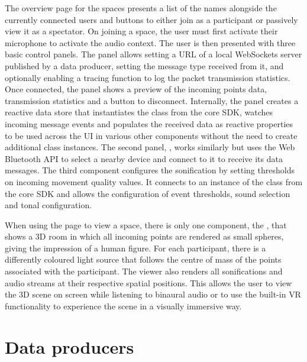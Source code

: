 The overview page for the spaces presents a list of the names alongside the currently connected users and buttons to either join as a participant or passively view it as a spectator.
On joining a space, the user must first activate their microphone to activate the audio context.
The user is then presented with three basic control panels.
The  panel allows setting a URL of a local WebSockets server published by a data producer, setting the message type received from it, and optionally enabling a tracing function to log the packet transmission statistics.
Once connected, the panel shows a preview of the incoming points data, transmission statistics and a button to disconnect.
Internally, the panel creates a reactive data store that instantiates the  class from the core \ac{SDK}, watches incoming message events and populates the received data as reactive properties to be used across the \ac{UI} in various other components without the need to create additional class instances.
The second panel, , works similarly but uses the Web Bluetooth \ac{API} to select a nearby device and connect to it to receive its data messages.
The third component configures the sonification by setting thresholds on incoming movement quality values.
It connects to an instance of the  class from the core \ac{SDK} and allows the configuration of event thresholds, sound selection and tonal configuration.

When using the page to view a space, there is only one component, the , that shows a \ac{3D} room in which all incoming points are rendered as small spheres, giving the impression of a human figure.
For each participant, there is a differently coloured light source that follows the centre of mass of the points associated with the participant.
The viewer also renders all sonifications and audio streams at their respective spatial positions.
This allows the user to view the \ac{3D} scene on screen while listening to binaural audio or to use the built-in \ac{VR} functionality to experience the scene in a visually immersive way.

\section{Data producers}
\label{sec:data-producers}

